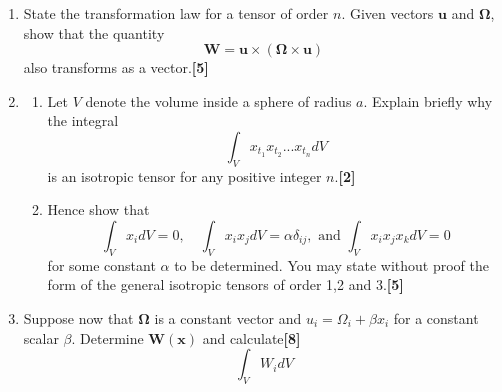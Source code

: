\documentclass[a4paper]{article}
\begin{document}
\newpage
\begin{qns}[Tensors]\leavevmode
\begin{enumerate}[label=(\alph*)]
\item State the transformation law for a tensor of order $n$. Given vectors $\mathbf{u}$ and $\boldsymbol{\Omega}$, show that the quantity
$$\mathbf{W}=\mathbf{u}\times(\boldsymbol{\Omega}\times\mathbf{u})$$
also transforms as a vector.\hfill\textbf{[5]}
\item 
\begin{enumerate}[label=(\roman*)]
\item Let $V$ denote the volume inside a sphere of radius $a$. Explain briefly why the integral
$$\int_Vx_{t_1}x_{t_2}...x_{t_n}dV$$
is an isotropic tensor for any positive integer $n$.\hfill\textbf{[2]}
\item Hence show that
$$\int_Vx_idV=0,\quad\int_Vx_ix_jdV=\alpha\delta_{ij},\text{ and  }\int_Vx_ix_jx_kdV=0$$
for some constant $\alpha$ to be determined. You may state without proof the form of the general isotropic tensors of order 1,2 and 3.\hfill\textbf{[5]}
\end{enumerate}
\item Suppose now that $\boldsymbol{\Omega}$ is a constant vector and $u_i=\Omega_i+\beta x_i$ for a constant scalar $\beta$. Determine $\mathbf{W}(\mathbf{x})$ and calculate\hfill\textbf{[8]}
$$\int_VW_idV$$
\end{enumerate}
\end{qns}
\end{document}
